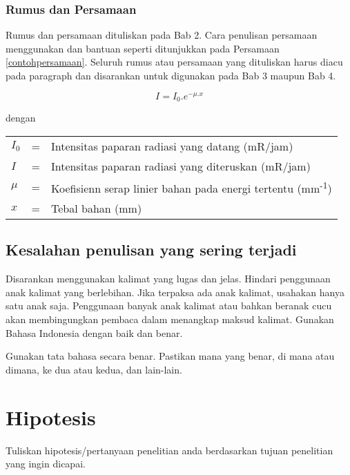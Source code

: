 \subsubsection{Rumus dan Persamaan} \label{rumus}
Rumus dan persamaan dituliskan pada Bab 2. Cara penulisan persamaan menggunakan  dan bantuan  seperti ditunjukkan pada Persamaan \ref{contohpersamaan}. Seluruh rumus atau persamaan yang dituliskan harus diacu pada paragraph dan disarankan untuk digunakan pada Bab 3 maupun Bab 4.

\begin{equation}\label{contohpersamaan}
	I=I_0.e^{-\mu.x}
\end{equation}

dengan

\begin{tabular}{lcl} 
	$I_0$ &	= & Intensitas paparan radiasi yang datang (mR/jam)\\
	$I$ &	= & Intensitas paparan radiasi yang diteruskan (mR/jam)\\
	$\mu$ &	= & Koefisienn serap linier bahan pada energi tertentu (mm\textsuperscript{-1})\\
	$x$ &	= & Tebal bahan (mm)\\
\end{tabular}

\subsection{Kesalahan penulisan yang sering terjadi}
Disarankan menggunakan kalimat yang lugas dan jelas. Hindari penggunaan anak kalimat yang berlebihan. Jika terpaksa ada anak kalimat, usahakan hanya satu anak saja. Penggunaan banyak anak kalimat atau bahkan beranak cucu akan membingungkan pembaca dalam menangkap maksud kalimat. Gunakan Bahasa Indonesia dengan baik dan benar.

Gunakan tata bahasa secara benar. Pastikan mana yang benar, di mana atau dimana, ke dua atau kedua, dan lain-lain. 

\section{Hipotesis}
Tuliskan hipotesis/pertanyaan penelitian anda berdasarkan tujuan penelitian yang ingin dicapai.